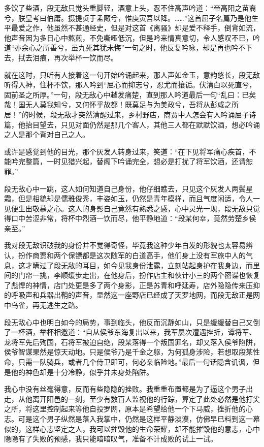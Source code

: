 多饮了些酒，段无敌只觉头重脚轻，酒意上头，忍不住高声吟道：“帝高阳之苗裔兮，朕皇考曰伯庸。摄提贞于孟陬兮，惟庚寅吾以降。……”这首屈子名篇乃是他生平最爱之作，他虽然不甚通经史，但是对这首《离骚》却是爱不释手，倒背如流，他声音因为多日心中熬煎，不免嘶哑低沉，但是吟来情真意切，令人感叹不已，吟道“亦余心之所善兮，虽九死其犹未悔”一句之时，他反复吟咏，却是再也吟不下去，拭去泪痕，再次举杯一饮而尽。

就在这时，只听有人接着这一句开始吟诵起来，那人声如金玉，意韵悠长，段无敌听得入神，住杯不饮，那人吟到“屈心而抑志兮，忍尤而攘诟。伏清白以死直兮，固前圣之所厚。”一句，段无敌心中越发痛楚，直到那人吟道最后一句“乱曰：已矣哉！国无人莫我知兮，又何怀乎故都！既莫足与为美政兮，吾将从彭咸之所居！”的时候，段无敌才突然清醒过来，乡村野店，商贾中人怎会有人吟诵屈子诗篇，他抬目望去，只见对面仍然是那几个客人，其他三人都在默默饮酒，想必吟诵之人是那个背对自己之人。

或许是感觉到他的目光，那个灰发人转身过来，笑道：“在下见将军痛心疾首，不能吟完整篇，一时见猎兴起，替阁下吟诵完全，想必是打扰了将军饮酒，还请恕罪。”

段无敌心中一跳，这人如何知道自己身份，他仔细瞧去，只见这个灰发人两鬓星霜，但是相貌却是儒雅俊秀，丰姿如玉，仍然是青年模样，而且气度闲适，令人一见便生出敬慕之心。这人的身影自己竟然有熟悉之感，心中灵光一现，段无敌只觉得口中苦涩非常，将杯中烈酒一饮而尽，他平静地道：“段某何幸，竟然劳楚乡侯亲至。”

我对段无敌识破我的身份并不觉得奇怪，毕竟我这种少年白发的形貌也太容易辨认，扮作商贾和两个保镖都是这次随军的白道高手，他们身上没有军旅中人的气息，这才瞒过了段无敌的耳目，如今见我身份泄露，立刻站起身护在我身边，而里间的门帘一挑，李顺缓步走出，在他身后，扮作店主和伙计小三的两个密谍也恢复了彪悍的神情，店门处更是多了两个身影，正是苏青和呼延寿，店外隐隐传来压抑的呼吸声和兵器出鞘的声音，显然这一座野店已经成了天罗地网，而段无敌正是网中鸟雀，再无逃生之路。

段无敌心中也明白如今的局势，事到临头，他反而沉静如山，只是缓缓替自己又倒了一杯酒，举杯相邀道：“自从侯爷东海复出以来，我军屡次遭遇挫折，谭将军、龙将军先后殉国，石将军被迫自绝，段某落得一个叛国罪名，却又落入侯爷陷阱，侯爷智谋果然是惊天动地。只是侯爷乃是千金之躯，为何孤身涉险，若想取段某性命，只需一队骑兵，或者几个侍卫即可，何必亲临险地。”最后一句话隐含讥讽，但是他的神色却是十分冷静，似乎并未身处陷阱。

我心中没有丝毫得意，反而有些隐隐的挫败。我重重布置都是为了逼这个男子出走，从他离开阳邑的一刻，至少有数百人监视他的行踪，算定了此处必然是他打尖之所，将这里控制起来等他自投罗网，原本是希望给他一个下马威，挫折他的心志。可是这个男子纵然是落入我掌中，仍然是这样平静淡漠，仿佛早已料到这一幕似的，这样心志坚定之人，我可以摧毁他的生命荣耀，却不能摧毁他的意志，心中隐隐有了失败的预感，我只能暗暗叹气，准备不计成败的试上一试。

